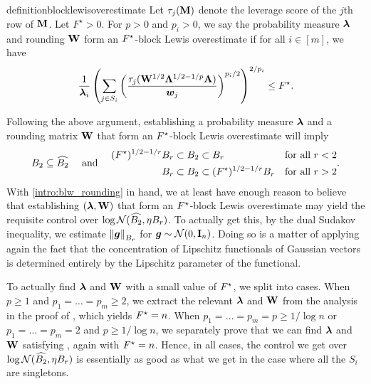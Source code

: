 \documentclass[11pt]{article}
\numberwithin{equation}{section}
\begin{document}
\begin{restatable}{definition}{blocklewisoverestimate}
\label{defn:block_lewis_overestimate}
Let $\tau_j(\mathbf{M})$ denote the leverage score of the $j$th row of $\mathbf{M}$. Let \(F^{\star} > 0\). For $p > 0$ and $p_i > 0$, we say the probability measure $\bm{\lambda}$ and rounding $\mathbf{W}$ form an $F^{\star}$-block Lewis overestimate if for all $i \in [m]$, we have
\begin{align*}
    \frac{1}{\bm{\lambda}_i}\left(\sum_{j \in S_i} \left(\frac{\tau_j(\mathbf{W}^{1/2}\mathbf{\Lambda}^{1/2-1/p}\mathbf{A})}{\bm{w}_j}\right)^{p_i/2}\right)^{2/p_i} \le F^{\star}.
\end{align*}
\end{restatable}
Following the above argument, establishing a probability measure $\bm{\lambda}$ and a rounding matrix $\mathbf{W}$ that form an $F^{\star}$-block Lewis overestimate will imply
\begin{equation}\label{intro:blw_rounding}
  B_2 \subseteq \widehat{B_2}\quad \text{ and }\quad
  \begin{aligned}
    (F^{\star})^{1/2-1/r}B_r &\subset B_2 \subset B_r & \text{for all } r < 2 \\
    B_r &\subset B_2 \subset (F^{\star})^{1/2-1/r}B_r & \text{for all } r > 2
  \end{aligned}.
\end{equation}
With \eqref{intro:blw_rounding} in hand, we at least have enough reason to believe that establishing $(\bm{\lambda}, \mathbf{W})$ that form an $F^{\star}$-block Lewis overestimate may yield the requisite control over $\log\mathcal{N}(\widehat{B_2},\eta B_r)$. To actually get this, by the dual Sudakov inequality, we estimate $\left\lVert \bm{g} \right\rVert_{B_r}$ for $\bm{g} \sim \mathcal{N}(0,\mathbf{I}_n)$. Doing so is a matter of applying again the fact that the concentration of Lipschitz functionals of Gaussian vectors is determined entirely by the Lipschitz parameter of the functional. 

To actually find $\bm{\lambda}$ and $\mathbf{W}$ with a small value of $F^{\star}$, we split into cases. When $p \ge 1$ and $p_1=\dots=p_m \ge 2$, we extract the relevant $\bm{\lambda}$ and $\mathbf{W}$ from the analysis in the proof of \cite[Lemma 4.2]{jlls23}, which yields $F^{\star} = n$. When $p_1=\dots=p_m=p\ge1/\log n$ or $p_1=\dots=p_m=2$ and $p\ge1/\log n$, we separately prove that we can find $\bm{\lambda}$ and $\mathbf{W}$ satisfying , again with $F^{\star} = n$. Hence, in all cases, the control we get over $\log\mathcal{N}(\widehat{B_2},\eta B_r)$ is essentially as good as what we get in the case where all the $S_i$ are singletons. %
\end{document}
